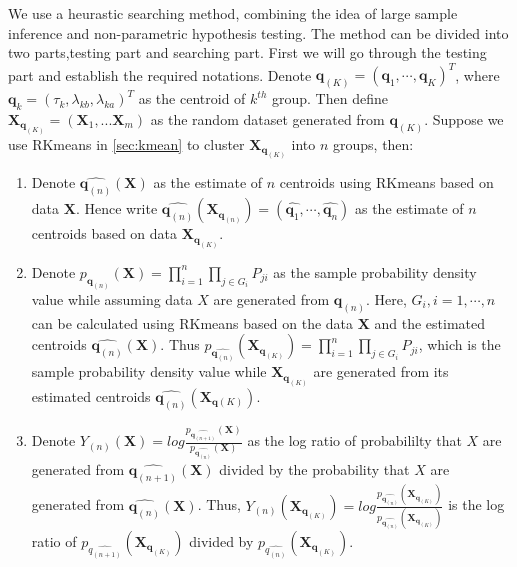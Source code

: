 \documentclass[12pt]{article}
\begin{document}
We use a heurastic searching method, combining the idea of large sample inference and non-parametric hypothesis testing. The method can be divided into two parts,testing part and searching part. First we will go through the testing part and establish the required notations. Denote $\pmb q_{(K)}=(\pmb q_1,\cdots,\pmb q_K)^T$, where $\pmb q_k=(\tau_k,\lambda_{kb},\lambda_{ka})^T$ as the centroid of $k^{th}$ group. Then define $\pmb X_{\pmb q_{(K)}}=(\pmb X_1,...\pmb X_m)$ as the random dataset generated from $\pmb q_{(K)}$.  Suppose we use RKmeans in \ref{sec:kmean} to cluster $\pmb X_{\pmb q_{(K)}}$ into $n$ groups, then:
\begin{enumerate}[(1):]
\item Denote $\hat{\pmb q_{(n)}}(\pmb X)$ as the estimate of $n$ centroids using RKmeans based on data $\pmb X$. Hence write  $\hat{\pmb q_{(n)}}(\pmb X_{\pmb q_{(n)}})=(\hat{\pmb q_1},\cdots,\hat{\pmb q_{n}})$ as the estimate of $n$ centroids based on data $\pmb X_{\pmb q_{(K)}}$.

\item Denote $p_{\pmb q_{(n)}}(\pmb X)=\prod_{i=1}^{n}\prod_{j\in G_i}P_{ji} $ as the sample probability density value while assuming data $X$ are generated from $\pmb q_{(n)}$. Here, $G_i,i=1,\cdots,n$ can be calculated using RKmeans based on the data $\pmb X$ and the estimated centroids $\hat{\pmb q_{(n)}}(\pmb X)$. Thus $p_{\hat{\pmb q_{(n)}}}(\pmb X_{\pmb q_{(K)}})=\prod_{i=1}^{n}\prod_{j\in G_i}P_{ji} $, which is the sample probability density value while  $\pmb X_{\pmb q_{(K)}}$ are generated from its estimated centroids $\hat{\pmb q_{(n)}}(\pmb X_{\pmb q{(K)}})$.
  
\item Denote $Y_{(n)}(\pmb X)=log \frac{p_{\hat{\pmb q_{(n+1)}}}(\pmb X)}{p_{\hat{\pmb q_{(n)}}}(\pmb X)}$  as the log ratio of probabililty that $X$ are generated from $\hat{\pmb q_{(n+1)}}(\pmb X)$ divided by the probability that $X$ are generated from $\hat{\pmb q_{(n)}}(\pmb X)$. Thus, $Y_{(n)}(\pmb X_{\pmb q_{(K)}})=log \frac{p_{\hat{\pmb q_{(n)}}}(\pmb X_{\pmb q_{(K)}})}{p_{\hat{\pmb q_{(n)}}}(\pmb X_{\pmb q_{(K)}})}$ is the log ratio of  $p_{\hat{q_{(n+1)}}}(\pmb X_{\pmb q_{(K)}})$ divided by  $p_{\hat{q_{(n)}}}(\pmb X_{\pmb q_{(K)}})$.

\end{enumerate}
\end{document}
